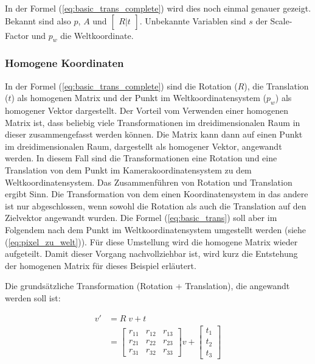 	In der Formel (\ref{eq:basic_trans_complete}) wird dies noch einmal genauer gezeigt. Bekannt sind also \( p \), \( A \) und \( \begin{bmatrix} R|t \end{bmatrix} \). Unbekannte Variablen sind \( s \) der Scale-Factor und \( p_w \) die Weltkoordinate.
	
	\subsubsection{Homogene Koordinaten}
	In der Formel (\ref{eq:basic_trans_complete}) sind die Rotation (\( R \)), die Translation (\( t \)) als homogenen Matrix und  der Punkt im Weltkoordinatensystem (\( p_w \)) als homogener Vektor dargestellt. Der Vorteil vom Verwenden einer homogenen Matrix ist, dass beliebig viele Transformationen im dreidimensionalen Raum in dieser zusammengefasst werden können. Die Matrix kann dann auf einen Punkt im dreidimensionalen Raum, dargestellt als homogener Vektor, angewandt werden. In diesem Fall sind die Transformationen eine Rotation und eine Translation von dem Punkt im Kamerakoordinatensystem zu dem Weltkoordinatensystem. Das Zusammenführen von Rotation und Translation ergibt Sinn. Die Transformation von dem einen Koordinatensystem in das andere ist nur abgeschlossen, wenn sowohl die Rotation als auch die Translation auf den Zielvektor angewandt wurden. Die Formel (\ref{eq:basic_trans}) soll aber im Folgendem nach dem Punkt im Weltkoordinatensystem umgestellt werden (siehe (\ref{eq:pixel_zu_welt})). Für diese Umstellung wird die homogene Matrix wieder aufgeteilt. Damit dieser Vorgang nachvollziehbar ist, wird kurz die Entstehung der homogenen Matrix für dieses Beispiel erläutert.
	
	Die grundsätzliche Transformation (Rotation + Translation), die angewandt werden soll ist:
	
	\begin{equation}
	\begin{aligned}
	v' &= R \; v + t \\
	&= \begin{bmatrix}
	r_{11} & r_{12} & r_{13} \\ 
	r_{21} & r_{22} & r_{23} \\ 
	r_{31} & r_{32} & r_{33}
	\end{bmatrix} v + \begin{bmatrix}
	t_1 \\ t_2 \\ t_3
	\end{bmatrix}
	\end{aligned}
	\label{eq:rot_trans}
	\end{equation}
	
